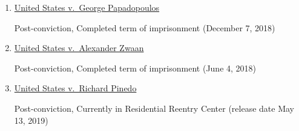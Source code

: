 \begin{enumerate}[1.]

    \item \underline{United States v.\ George Papadopoulos}

Post-conviction, Completed term of imprisonment (December 7, 2018)

    \item \underline{United States v.\ Alexander Zwaan}

Post-conviction, Completed term of imprisonment (June 4, 2018)

    \item \underline{United States v.\ Richard Pinedo}

Post-conviction, Currently in Residential Reentry Center (release date May 13, 2019)

\end{enumerate}
